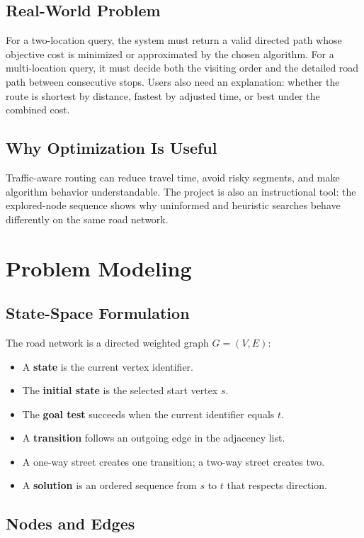 \documentclass[12pt,a4paper,oneside]{report}
\begin{document}
\section{Real-World Problem}
For a two-location query, the system must return a valid directed path whose
objective cost is minimized or approximated by the chosen algorithm. For a
multi-location query, it must decide both the visiting order and the detailed
road path between consecutive stops. Users also need an explanation: whether
the route is shortest by distance, fastest by adjusted time, or best under the
combined cost.

\section{Why Optimization Is Useful}
Traffic-aware routing can reduce travel time, avoid risky segments, and make
algorithm behavior understandable. The project is also an instructional tool:
the explored-node sequence shows why uninformed and heuristic searches behave
differently on the same road network.

\chapter{Problem Modeling}

\section{State-Space Formulation}
The road network is a directed weighted graph $G=(V,E)$:
\begin{itemize}
\item A \textbf{state} is the current vertex identifier.
\item The \textbf{initial state} is the selected start vertex $s$.
\item The \textbf{goal test} succeeds when the current identifier equals $t$.
\item A \textbf{transition} follows an outgoing edge in the adjacency list.
\item A one-way street creates one transition; a two-way street creates two.
\item A \textbf{solution} is an ordered sequence from $s$ to $t$ that respects direction.
\end{itemize}

\section{Nodes and Edges}
\end{document}
